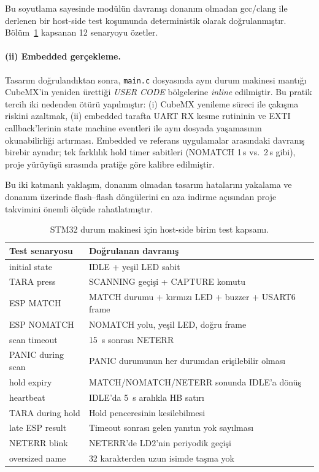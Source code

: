 Bu soyutlama sayesinde modülün davranışı donanım olmadan
gcc/clang ile derlenen bir host-side test koşumunda deterministik olarak
doğrulanmıştır. Bölüm~\ref{tab:host-tests} kapsanan 12 senaryoyu özetler.

\paragraph{(ii) Embedded gerçekleme.}
Tasarım doğrulandıktan sonra, \texttt{main.c} dosyasında aynı durum
makinesi mantığı CubeMX'in yeniden ürettiği \emph{USER CODE} bölgelerine
\emph{inline} edilmiştir. Bu pratik tercih iki nedenden ötürü
yapılmıştır: (i) CubeMX yenileme süreci ile çakışma riskini azaltmak,
(ii) embedded tarafta UART RX kesme rutininin ve EXTI callback'lerinin
state machine eventleri ile aynı dosyada yaşamasının okunabilirliği
artırması. Embedded ve referans uygulamalar arasındaki davranış birebir
aynıdır; tek farklılık hold timer sabitleri (NOMATCH 1\,s vs.\ 2\,s
gibi), proje yürüyüşü sırasında pratiğe göre kalibre edilmiştir.

Bu iki katmanlı yaklaşım, donanım olmadan tasarım hatalarını yakalama
ve donanım üzerinde flash--flash döngülerini en aza indirme açısından
proje takvimini önemli ölçüde rahatlatmıştır.

\begin{table}[h!]
\centering
\caption{STM32 durum makinesi için host-side birim test kapsamı.}
\label{tab:host-tests}
\small
\begin{tabular}{l l}
\toprule
\textbf{Test senaryosu} & \textbf{Doğrulanan davranış}\\
\midrule
initial state              & IDLE + yeşil LED sabit\\
TARA press                 & SCANNING geçişi + CAPTURE komutu\\
ESP MATCH                  & MATCH durumu + kırmızı LED + buzzer + USART6 frame\\
ESP NOMATCH                & NOMATCH yolu, yeşil LED, doğru frame\\
scan timeout               & 15~s sonrası NETERR\\
PANIC during scan          & PANIC durumunun her durumdan erişilebilir olması\\
hold expiry                & MATCH/NOMATCH/NETERR sonunda IDLE'a dönüş\\
heartbeat                  & IDLE'da 5~s aralıkla HB satırı\\
TARA during hold           & Hold penceresinin kesilebilmesi\\
late ESP result            & Timeout sonrası gelen yanıtın yok sayılması\\
NETERR blink               & NETERR'de LD2'nin periyodik geçişi\\
oversized name             & 32 karakterden uzun isimde taşma yok\\
\bottomrule
\end{tabular}
\end{table}

